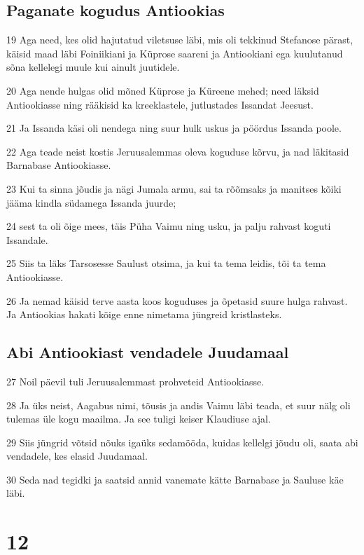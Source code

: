 \section*{Paganate kogudus Antiookias}

\par 19 Aga need, kes olid hajutatud viletsuse läbi, mis oli tekkinud Stefanose pärast, käisid maad läbi Foiniikiani ja Küprose saareni ja Antiookiani ega kuulutanud sõna kellelegi muule kui ainult juutidele.
\par 20 Aga nende hulgas olid mõned Küprose ja Küreene mehed; need läksid Antiookiasse ning rääkisid ka kreeklastele, jutlustades Issandat Jeesust.
\par 21 Ja Issanda käsi oli nendega ning suur hulk uskus ja pöördus Issanda poole.
\par 22 Aga teade neist kostis Jeruusalemmas oleva koguduse kõrvu, ja nad läkitasid Barnabase Antiookiasse.
\par 23 Kui ta sinna jõudis ja nägi Jumala armu, sai ta rõõmsaks ja manitses kõiki jääma kindla südamega Issanda juurde;
\par 24 sest ta oli õige mees, täis Püha Vaimu ning usku, ja palju rahvast koguti Issandale.
\par 25 Siis ta läks Tarsosesse Saulust otsima, ja kui ta tema leidis, tõi ta tema Antiookiasse.
\par 26 Ja nemad käisid terve aasta koos koguduses ja õpetasid suure hulga rahvast. Ja Antiookias hakati kõige enne nimetama jüngreid kristlasteks.

\section*{Abi Antiookiast vendadele Juudamaal}

\par 27 Noil päevil tuli Jeruusalemmast prohveteid Antiookiasse.
\par 28 Ja üks neist, Aagabus nimi, tõusis ja andis Vaimu läbi teada, et suur nälg oli tulemas üle kogu maailma. Ja see tuligi keiser Klaudiuse ajal.
\par 29 Siis jüngrid võtsid nõuks igaüks sedamööda, kuidas kellelgi jõudu oli, saata abi vendadele, kes elasid Juudamaal.
\par 30 Seda nad tegidki ja saatsid annid vanemate kätte Barnabase ja Sauluse käe läbi.


\chapter{12}

